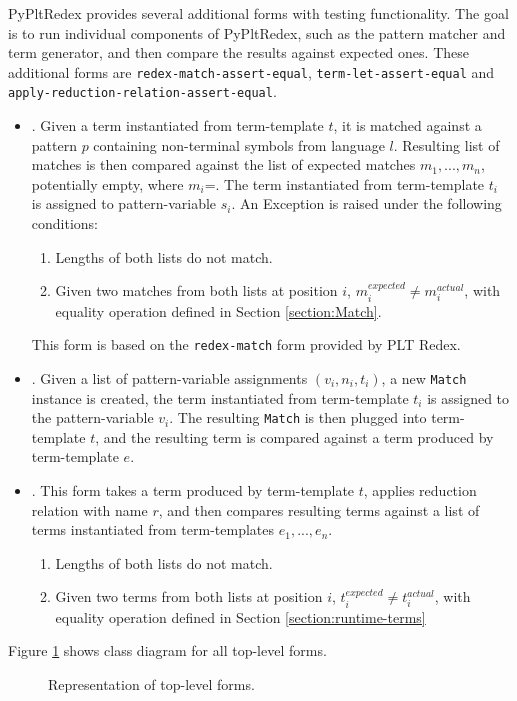 PyPltRedex provides several additional forms with testing functionality. The goal is to run individual components of PyPltRedex, such as the pattern matcher and term generator, and then compare the results against expected ones. These additional forms are \texttt{redex-match-assert-equal}, \texttt{term-let-assert-equal} and \\ \texttt{apply-reduction-relation-assert-equal}.

\begin{itemize}
\item \RedexMatchAssertEqual. Given a term instantiated from term-template $t$, it is matched against a pattern $p$ containing non-terminal symbols from language $l$. Resulting list of matches is then compared against the list of expected matches $m_1,...,m_n$, potentially empty, where $m_i$=\Match. The term instantiated from term-template $t_i$ is assigned to pattern-variable $s_i$. An Exception is raised under the following conditions:
	\begin{enumerate}
	\item Lengths of both lists do not match.
	\item Given two matches from both lists at position $i$, $m_i^{expected} \neq m_i^{actual}$, with equality operation defined in Section \ref{section:Match}.
	\end{enumerate}
	This form is based on the \texttt{redex-match} form provided by PLT Redex.

\item \TermLetAssertEqual. Given a list of pattern-variable assignments $(v_i, n_i, t_i)$, a new \texttt{Match} instance is created, the term instantiated from term-template $t_i$ is assigned to the pattern-variable $v_i$. The resulting \texttt{Match} is then plugged into term-template $t$, and the resulting term is compared against a term produced by term-template $e$.

\item \ApplyReductionRelationAssertEqual. This form takes a term produced by term-template $t$, applies reduction relation with name $r$, and then compares resulting terms against a list of terms instantiated from term-templates $e_1,...,e_n$.
	\begin{enumerate}
	\item Lengths of both lists do not match.
	\item Given two terms from both lists at position $i$, $t_i^{expected} \neq t_i^{actual}$, with equality operation defined in Section \ref{section:runtime-terms}
	\end{enumerate}
\end{itemize}

Figure \ref{class-diagram-toplevel} shows class diagram for all top-level forms.

\begin{figure}[H]
	\centering
	\caption{Representation of top-level forms.}
\label{class-diagram-toplevel}
\end{figure}
